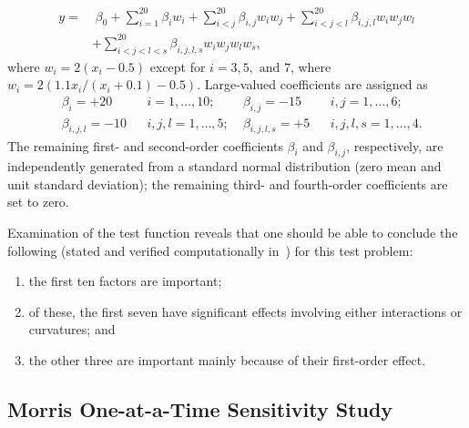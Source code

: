 \begin{align*}
y = &\;\beta_0 + \sum_{i=1}^{20}{\beta_i w_i} + \sum_{i<j}^{20}{\beta_{i,j} w_i w_j} + \sum_{i<j<l}^{20}{\beta_{i,j,l} w_i w_j w_l} \\
    &+  \sum_{i<j<l<s}^{20}{\beta_{i,j,l,s} w_i w_j w_l w_s},
\end{align*}
where $w_i = 2(x_i-0.5)$ except for $i=3, 5, \mbox{ and } 7$, where $w_i=2(1.1x_i/(x_i+0.1) - 0.5)$. Large-valued coefficients are assigned as 
\begin{align*}
&\beta_i = +20 & &i=1,\ldots,10; \;&\beta_{i,j} = -15& &i,j = 1, \ldots, 6; \\
&\beta_{i,j,l} = -10& &i,j,l=1,\ldots,5; \;&\beta_{i,j,l,s} = +5& &i,j,l,s = 1, \ldots, 4.
\end{align*}
The remaining first- and second-order coefficients $\beta_i$ and
$\beta_{i,j}$, respectively, are independently generated from a
standard normal distribution (zero mean and unit standard deviation);
the remaining third- and fourth-order coefficients are set to zero.

Examination of the test function reveals that one should be able to
conclude the following (stated and verified computationally
in~\cite{Sal04}) for this test problem:
\begin{enumerate}
\item the first ten factors are important;
\item of these, the first seven have significant effects involving
      either interactions or curvatures; and
\item the other three are important mainly because of their first-order
      effect.
\end{enumerate}

\subsection{Morris One-at-a-Time Sensitivity Study}

